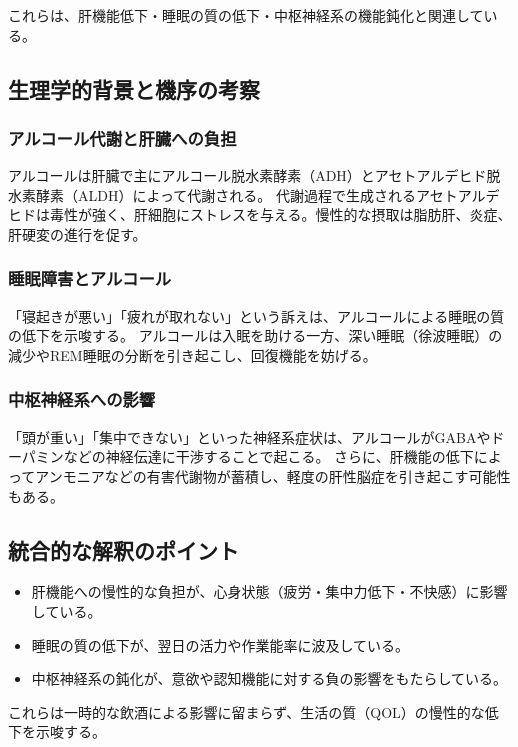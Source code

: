 \documentclass[a4paper,12pt]{article}
\begin{document}
これらは、肝機能低下・睡眠の質の低下・中枢神経系の機能鈍化と関連している。

\subsection*{生理学的背景と機序の考察}

\subsubsection*{アルコール代謝と肝臓への負担}

アルコールは肝臓で主にアルコール脱水素酵素（ADH）とアセトアルデヒド脱水素酵素（ALDH）によって代謝される。  
代謝過程で生成されるアセトアルデヒドは毒性が強く、肝細胞にストレスを与える。慢性的な摂取は脂肪肝、炎症、肝硬変の進行を促す。

\subsubsection*{睡眠障害とアルコール}

「寝起きが悪い」「疲れが取れない」という訴えは、アルコールによる睡眠の質の低下を示唆する。  
アルコールは入眠を助ける一方、深い睡眠（徐波睡眠）の減少やREM睡眠の分断を引き起こし、回復機能を妨げる。

\subsubsection*{中枢神経系への影響}

「頭が重い」「集中できない」といった神経系症状は、アルコールがGABAやドーパミンなどの神経伝達に干渉することで起こる。  
さらに、肝機能の低下によってアンモニアなどの有害代謝物が蓄積し、軽度の肝性脳症を引き起こす可能性もある。

\subsection*{統合的な解釈のポイント}

\begin{itemize}
  \item 肝機能への慢性的な負担が、心身状態（疲労・集中力低下・不快感）に影響している。
  \item 睡眠の質の低下が、翌日の活力や作業能率に波及している。
  \item 中枢神経系の鈍化が、意欲や認知機能に対する負の影響をもたらしている。
\end{itemize}

これらは一時的な飲酒による影響に留まらず、生活の質（QOL）の慢性的な低下を示唆する。
\end{document}
